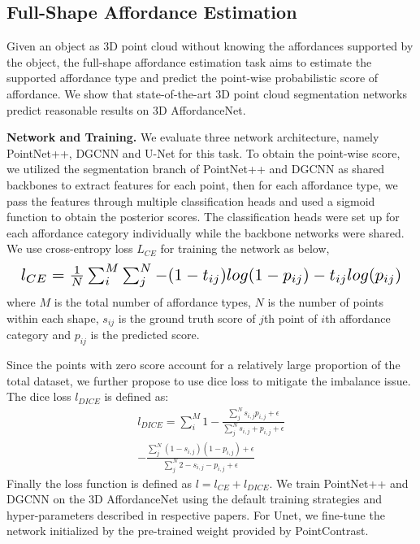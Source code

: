 \documentclass[final]{cvpr}
\begin{document}
\subsection{Full-Shape Affordance Estimation} \label{estimation task}

Given an object as 3D point cloud without knowing the affordances supported by the object, the full-shape affordance estimation task aims to estimate the supported affordance type and predict the point-wise probabilistic score of affordance. We show that state-of-the-art 3D point cloud segmentation networks predict reasonable results on 3D AffordanceNet. 

\noindent\textbf{Network and Training.} {We evaluate three network architecture, namely PointNet++\cite{qi2017pointnet++}, DGCNN\cite{wang2019dynamic} and U-Net\cite{xie2020pointcontrast} for this task.} To obtain the point-wise score, we utilized the segmentation branch of PointNet++ and DGCNN as shared backbones to extract features for each point, then for each affordance type, we pass the features through multiple classification heads and used a sigmoid function to obtain the posterior scores. The classification heads were set up for each affordance category individually while the backbone networks were shared. We use cross-entropy loss $L_{CE}$ for training the network as below,
\begin{equation}
    \resizebox{\linewidth}{!}{
    $l_{CE} = \frac{1}{N}\sum_{i}^{M}\sum_{j}^{N}-(1-t_{ij})log(1-p_{ij})-t_{ij}log(p_{ij})$
    }
\end{equation}
where $M$ is the total number of affordance types, $N$ is  the number of points within each shape, $s_{ij}$ is the ground truth score of $j$th point of $i$th affordance category and $p_{ij}$ is the predicted score.

Since the points with zero score account for a relatively large proportion of the total dataset, we further propose to use dice loss \cite{milletari2016v} to mitigate the imbalance issue. The dice loss $l_{DICE}$ is defined as:
\vspace{-0.2cm}
\begin{equation}
    \begin{split}
    l_{DICE} = \sum_{i}^{M}1 - \frac{\sum_{j}^{N}s_{i,j}p_{i,j}+\epsilon}{\sum_{j}^{N}s_{i,j}+p_{i,j}+\epsilon} \\
      -\frac{\sum_{j}^{N}(1-s_{i,j})(1-p_{i,j})+\epsilon}{\sum_{j}^{N}2 - s_{i,j} - p_{i,j}+\epsilon}
    \end{split}
\end{equation}
Finally the loss function is defined as $l = l_{CE}+l_{DICE}$. {We train PointNet++ and DGCNN on the 3D AffordanceNet using the default training strategies and hyper-parameters described in respective papers\cite{qi2017pointnet++,wang2019dynamic}. For Unet, we fine-tune the network initialized by the pre-trained weight provided by PointContrast\cite{xie2020pointcontrast}.}
\end{document}
